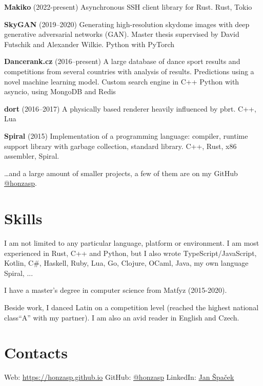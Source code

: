 \documentclass[10pt,a4paper]{article}
\begin{document}
\begin{multicols}{2}
\textbf{Makiko} (2022-present)
  \newline Asynchronous SSH client library for Rust.
  \newline Rust, Tokio

\textbf{SkyGAN} (2019–2020)
  \newline Generating high-resolution skydome images with deep generative
  adversarial networks (GAN).
  \newline Master thesis supervised by David Futschik and Alexander Wilkie.
  \newline Python with PyTorch

\textbf{Dancerank.cz} (2016–present)
  \newline A large database of dance sport results and competitions from several
  countries with analysis of results.
  \newline Predictions using a novel machine learning model.
  \newline Custom search engine in C++
  \newline Python with asyncio, using MongoDB and Redis

\textbf{dort} (2016–2017)
  \newline A physically based renderer heavily influenced by pbrt.
  \newline C++, Lua

\textbf{Spiral} (2015)
  \newline Implementation of a programming language: compiler, runtime support
  library with garbage collection, standard library.
  \newline C++, Rust, x86 assembler, Spiral.

\ldots{}and a large amount of smaller projects, a few of them are on my GitHub 
\href{https://github.com/honzasp}{@honzasp}.

\section*{Skills}

I am not limited to any particular language, platform or environment. I am most
experienced in Rust, C++ and Python, but I also wrote
{\small TypeScript/JavaScript, Kotlin,}
{\footnotesize C\#, Haskell, Ruby, Lua, Go,}
{\scriptsize Clojure, OCaml, Java, my own language Spiral, ...}

I have a master's degree in computer science from Matfyz (2015-2020).

Beside work, I danced Latin on a competition level (reached the highest national
class``A'' with my partner). I am also an avid reader in English and Czech.

\section*{Contacts}

Web: \url{https://honzasp.github.io}\newline
GitHub: \href{https://github.com/honzasp}{@honzasp}\newline
LinkedIn: \href{https://www.linkedin.com/in/honzasp}{Jan Špaček}\newline

\end{multicols}
\end{document}

